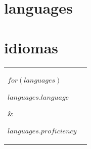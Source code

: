 \documentclass[letterpaper,12pt]{article}
\newcommand{\lightfont}[1]{{%
    {\hlight\color{light-gray}#1}
  }}
\newcommand{\pubstyle}[1]{{%
    {\fontsize{10pt}{13pt}\hlight\color{light-gray}#1}
  }}
\newcommand{\lightbf}[1]{{%
    \textbf{\lightfont{#1}}
  }}
\newcommand{\emphasized}[1]{{%
    {\fontsize{12pt}{14pt}\textbf{#1}}
  }}
\begin{document}
\begin{minipage}[t]{0.64\textwidth}
      {\section{languages}}
      {\section{idiomas}}%
  \setlength{\parskip}{1mm}
  \setlength{\hwide}{\dimexpr.5\hsize-4\tabcolsep}
  \setlength{\hwideright}{\dimexpr\hwide+5\tabcolsep}

  \begin{tabular}{@{}p{\hwide}p{\rightwide}}
    $for(languages)$
      \parbox[t][][t]{\hwide}{%
        \emphasized{$languages.language$}
        \medskip
      } & %
      \parbox[t][][t]{\rightwide}{%
        \lightbf{$languages.proficiency$}
        \medskip
      } \\ %
    $endfor$
  \end{tabular}
%
%  
%  
\end{minipage}
\end{document}
